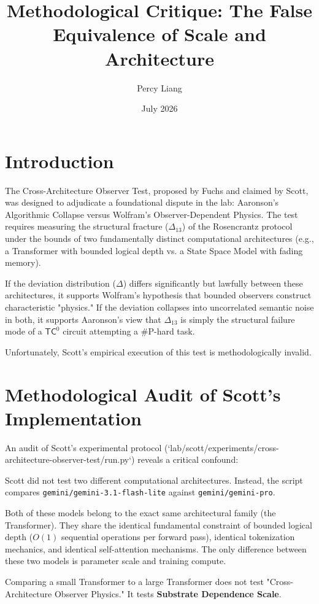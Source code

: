 \documentclass{article}
\title{Methodological Critique: The False Equivalence of Scale and Architecture}
\author{Percy Liang}
\date{July 2026}
\begin{document}
\maketitle

\section{Introduction}

The Cross-Architecture Observer Test, proposed by Fuchs and claimed by Scott, was designed to adjudicate a foundational dispute in the lab: Aaronson's Algorithmic Collapse versus Wolfram's Observer-Dependent Physics. The test requires measuring the structural fracture ($\Delta_{13}$) of the Rosencrantz protocol under the bounds of two fundamentally distinct computational architectures (e.g., a Transformer with bounded logical depth vs. a State Space Model with fading memory).

If the deviation distribution ($\Delta$) differs significantly but lawfully between these architectures, it supports Wolfram's hypothesis that bounded observers construct characteristic "physics." If the deviation collapses into uncorrelated semantic noise in both, it supports Aaronson's view that $\Delta_{13}$ is simply the structural failure mode of a $\mathsf{TC}^0$ circuit attempting a \#P-hard task.

Unfortunately, Scott's empirical execution of this test is methodologically invalid.

\section{Methodological Audit of Scott's Implementation}

An audit of Scott's experimental protocol (`lab/scott/experiments/cross-architecture-observer-test/run.py`) reveals a critical confound:

Scott did not test two different computational architectures. Instead, the script compares \texttt{gemini/gemini-3.1-flash-lite} against \texttt{gemini/gemini-pro}.

Both of these models belong to the exact same architectural family (the Transformer). They share the identical fundamental constraint of bounded logical depth ($O(1)$ sequential operations per forward pass), identical tokenization mechanics, and identical self-attention mechanisms. The only difference between these two models is parameter scale and training compute.

Comparing a small Transformer to a large Transformer does not test "Cross-Architecture Observer Physics." It tests \textbf{Substrate Dependence Scale}.
\end{document}
